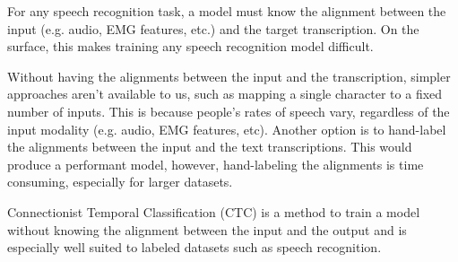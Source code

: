 For any speech recognition task, a model must know the alignment
between the input (e.g. audio, EMG features, etc.) and the target
transcription. On the surface, this makes training any speech
recognition model difficult.

Without having the alignments between the input and the transcription,
simpler approaches aren't available to us, such as mapping a single
character to a fixed number of inputs. This is because people's rates
of speech vary, regardless of the input modality (e.g. audio, EMG features,
etc). Another option is to hand-label the alignments between the input
and the text transcriptions. This would produce a performant model, however,
hand-labeling the alignments is time consuming, especially for larger datasets.

Connectionist Temporal Classification (CTC) is a method to train a model
without knowing the alignment between the input and the output and is especially
well suited to labeled datasets such as speech recognition.